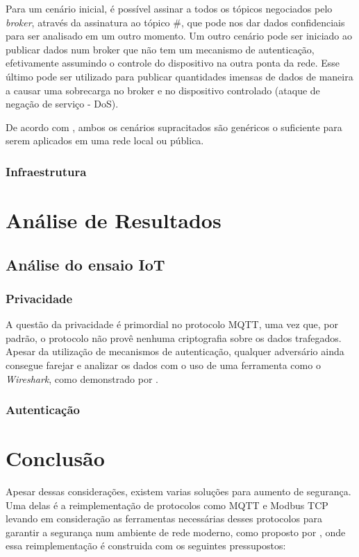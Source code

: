 \documentclass[tcc,capa]{texufpel}
\begin{document}
Para um cenário inicial, é possível assinar a todos os tópicos negociados pelo \textit{broker}, através da assinatura ao tópico $\#$, que pode nos dar dados confidenciais para ser
analisado em um outro momento. Um outro cenário pode ser iniciado ao publicar dados num broker que não tem um mecanismo de autenticação, efetivamente assumindo o controle do
dispositivo na outra ponta da rede. Esse último pode ser utilizado para publicar quantidades imensas de dados de maneira a causar uma sobrecarga no broker e no dispositivo
controlado (ataque de negação de serviço - DoS).

De acordo com \citet{attack2017}, ambos os cenários supracitados são genéricos o suficiente para serem aplicados em uma rede local ou pública.

\subsection{Infraestrutura}



\chapter{Análise de Resultados}


\section{Análise do ensaio IoT}
\subsection{Privacidade}
A questão da privacidade é primordial no protocolo MQTT, uma vez que, por padrão, o protocolo não provê nenhuma criptografia sobre os dados trafegados. Apesar da utilização de
mecanismos de autenticação, qualquer adversário ainda consegue farejar e analizar os dados com o uso de uma ferramenta como o \textit{Wireshark}, como demonstrado por
\citet{attack2017}.
\subsection{Autenticação}

\chapter{Conclusão}
Apesar dessas considerações, existem varias soluções para aumento de segurança. Uma delas é a reimplementação de protocolos como MQTT e Modbus TCP levando em consideração as
ferramentas necessárias desses protocolos para garantir a segurança num ambiente de rede moderno, como proposto por \citet{fovino2009design}, onde essa reimplementação é construida
com os seguintes pressupostos:
\end{document}
